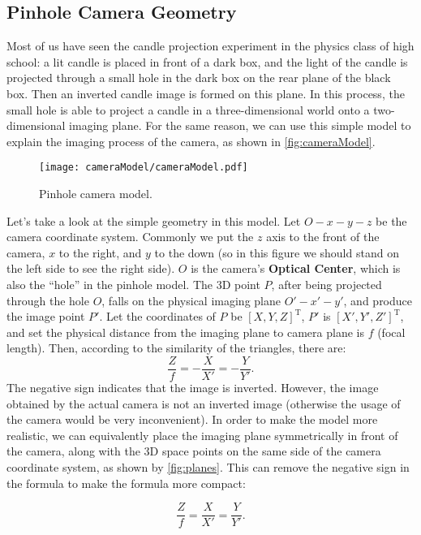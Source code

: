 \subsection{Pinhole Camera Geometry}
Most of us have seen the candle projection experiment in the physics class of high school: a lit candle is placed in front of a dark box, and the light of the candle is projected through a small hole in the dark box on the rear plane of the black box. Then an inverted candle image is formed on this plane. In this process, the small hole is able to project a candle in a three-dimensional world onto a two-dimensional imaging plane. For the same reason, we can use this simple model to explain the imaging process of the camera, as shown in \autoref{fig:cameraModel}.

\begin{figure}[!ht]
	\centering
	\texttt{[image: cameraModel/cameraModel.pdf]}
	\caption{Pinhole camera model. }
	\label{fig:cameraModel}
\end{figure}

Let's take a look at the simple geometry in this model. Let $O-x-y-z$ be the camera coordinate system. Commonly we put the $z$ axis to the front of the camera, $x$ to the right, and $y$ to the down (so in this figure we should stand on the left side to see the right side). $O$ is the camera's \textbf{Optical Center}, which is also the ``hole'' in the pinhole model. The 3D point $P$, after being projected through the hole $O$, falls on the physical imaging plane $O'-x'-y'$, and produce the image point $P'$. Let the coordinates of $P$ be $[X,Y,Z]^\mathrm{T}$, $P'$ is $[X',Y',Z']^\mathrm{T}$, and set the physical distance from the imaging plane to camera plane is $f$ (focal length). Then, according to the similarity of the triangles, there are:
\begin{equation}
\frac{Z}{f} = -\frac{X}{{X'}} =-\frac{Y}{{Y'}}.
\end{equation}
The negative sign indicates that the image is inverted. However, the image obtained by the actual camera is not an inverted image (otherwise the usage of the camera would be very inconvenient). In order to make the model more realistic, we can equivalently place the imaging plane symmetrically in front of the camera, along with the 3D space points on the same side of the camera coordinate system, as shown by \autoref{fig:planes}. This can remove the negative sign in the formula to make the formula more compact:

\begin{equation}
\frac{Z}{f} = \frac{X}{{X'}} =\frac{Y}{{Y'}}.
\end{equation}

